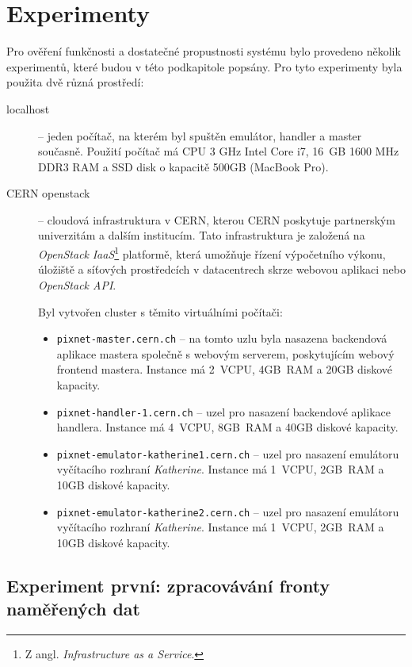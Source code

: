 \section{Experimenty}
Pro ověření funkčnosti a dostatečné propustnosti systému bylo provedeno několik experimentů, které budou v této podkapitole popsány. Pro tyto experimenty byla použita dvě různá prostředí:
\begin{description}
    \item[localhost] -- jeden počítač, na kterém byl spuštěn emulátor, handler a master současně. Použití počítač má CPU 3 GHz Intel Core i7, 16 GB 1600 MHz DDR3 RAM a SSD disk o kapacitě \unit{500}{GB} (MacBook Pro).
    \item[CERN openstack] -- cloudová infrastruktura v CERN, kterou CERN poskytuje partnerským univerzitám a dalším institucím. Tato infrastruktura je založená na \textit{OpenStack} \textit{IaaS}\footnote{Z angl. \textit{Infrastructure as a Service}.} platformě, která umožňuje řízení výpočetního výkonu, úložiště a síťových prostředcích v datacentrech skrze webovou aplikaci nebo \textit{OpenStack API}.

    Byl vytvořen cluster s těmito virtuálními počítači:
    \begin{itemize}
        \item \texttt{pixnet-master.cern.ch} -- na tomto uzlu byla nasazena backendová aplikace mastera společně s webovým serverem, poskytujícím webový frontend mastera. Instance má 2~VCPU, \unit{4}{GB}~RAM a \unit{20}{GB} diskové kapacity.
        \item \texttt{pixnet-handler-1.cern.ch} -- uzel pro nasazení backendové aplikace handlera. Instance má 4~VCPU, \unit{8}{GB}~RAM a \unit{40}{GB} diskové kapacity.
        \item \texttt{pixnet-emulator-katherine1.cern.ch} -- uzel pro nasazení emulátoru vyčítacího rozhraní \textit{Katherine}. Instance má 1~VCPU, \unit{2}{GB}~RAM a \unit{10}{GB} diskové kapacity.
        \item \texttt{pixnet-emulator-katherine2.cern.ch} -- uzel pro nasazení emulátoru vyčítacího rozhraní \textit{Katherine}. Instance má 1~VCPU, \unit{2}{GB}~RAM a \unit{10}{GB} diskové kapacity.
    \end{itemize}

\end{description}

\subsection{Experiment první: zpracovávání fronty naměřených dat}


